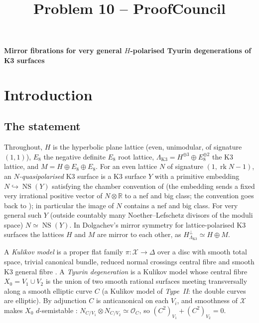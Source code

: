 \documentclass[12pt]{article}
\newcommand{\NS}{\operatorname{NS}}
\newcommand{\rk}{\operatorname{rk}}
\newcommand{\calX}{\mathcal X}
\newcommand{\LK}{\Lambda_{\mathrm{K3}}}
\theoremstyle{definition}
\theoremstyle{remark}
\begin{document}
\title{Problem 10 -- ProofCouncil}
\author{}
\date{}
\maketitle


\begin{center}
\textbf{Mirror fibrations for very general \(H\)-polarised Tyurin
degenerations of K3 surfaces}
\end{center}

\section{Introduction}

\subsection{The statement}

Throughout, \(H\) is the hyperbolic plane lattice (even, unimodular,
of signature \((1,1)\)), \(E_8\) the negative definite \(E_8\) root
lattice, \(\LK=H^{\oplus3}\oplus E_8^{\oplus2}\) the K3 lattice, and
\(M=H\oplus E_8\oplus E_8\). For an even lattice \(N\) of signature
\((1,\rk N-1)\), an \emph{\(N\)-quasipolarised} K3 surface is a K3
surface \(Y\) with a primitive embedding \(N\hookrightarrow\NS(Y)\)
satisfying the chamber convention of \cite[Definition~3.19]{GT} (the
embedding sends a fixed very irrational positive vector of
\(N\otimes\mathbb R\) to a nef and big class; the convention goes back
to \cite{Do}); in particular the image of \(N\) contains a nef and big
class. For very general such \(Y\) (outside countably
many Noether--Lefschetz divisors of the moduli space)
\(N\simeq\NS(Y)\). In Dolgachev's mirror symmetry for
lattice-polarised K3 surfaces \cite{Do} the lattices \(H\) and \(M\)
are mirror to each other, as \(H^\perp_{\LK}\simeq H\oplus M\).

A \emph{Kulikov model} is a proper flat family
\(\pi\colon\calX\to\Delta\) over a disc with smooth total space,
trivial canonical bundle, reduced normal crossings central fibre and
smooth K3 general fibre \cite{Ku}. A \emph{Tyurin degeneration} is a
Kulikov model whose central fibre \(X_0=V_1\cup V_2\) is the union of
two smooth rational surfaces meeting transversally along a smooth
elliptic curve \(C\) (a Kulikov model of \emph{Type~II}: the double
curves are elliptic). By adjunction \(C\) is anticanonical on each
\(V_i\), and smoothness of \(\calX\) makes \(X_0\) \(d\)-semistable
\cite{Fr83}: \(N_{C/V_1}\otimes N_{C/V_2}\simeq\mathcal O_C\), so
\((C^2)_{V_1}+(C^2)_{V_2}=0\).
\end{document}
